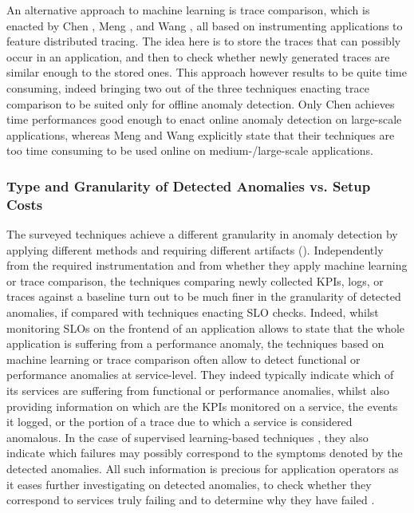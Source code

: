 An alternative approach to machine learning is trace comparison, which is enacted by Chen \etal \cite{39_Chen2020_MatrixSketchBasedAnomalyDetection}, Meng \etal \cite{23_Meng2021_DetectingAnomaliesMicroservices}, and Wang \etal \cite{26_Wang2020_WorkflowAwareFaultDiagnosis}, all based on instrumenting applications to feature distributed tracing.
The idea here is to store the traces that can possibly occur in an application, and then to check whether newly generated traces are similar enough to the stored ones.
This approach however results to be quite time consuming, indeed bringing two out of the three techniques enacting trace comparison to be suited only for offline anomaly detection.
Only Chen \etal \cite{39_Chen2020_MatrixSketchBasedAnomalyDetection} achieves time performances good enough to enact online anomaly detection on large-scale applications, whereas Meng \etal \cite{23_Meng2021_DetectingAnomaliesMicroservices} and Wang \etal \cite{26_Wang2020_WorkflowAwareFaultDiagnosis} explicitly state that their techniques are too time consuming to be used online on medium-/large-scale applications.

\subsubsection{Type and Granularity of Detected Anomalies vs. Setup Costs}
\label{sec:detection:discussion:type-granularity-costs}
The surveyed techniques achieve a different granularity in anomaly detection by applying different methods and requiring different artifacts ().
Independently from the required instrumentation and from whether they apply machine learning or trace comparison, the techniques comparing newly collected KPIs, logs, or traces against a baseline turn out to be much finer in the granularity of detected anomalies, if compared with techniques enacting SLO checks.
Indeed, whilst monitoring SLOs on the frontend of an application allows to state that the whole application is suffering from a performance anomaly, the techniques based on machine learning or trace comparison often allow to detect functional or performance anomalies at service-level.
They indeed typically indicate which of its services are suffering from functional or performance anomalies, whilst also providing information on which are the KPIs monitored on a service, the events it logged, or the portion of a trace due to which a service is considered anomalous.
In the case of supervised learning-based techniques \cite{36_Bogatinovski2020_SelfSupervisedAnomalyDetection,15_Du2018_AnomalyDetectionContainerMicroservices,02_Zhou2019_LatentErrorPrediction,34_Nedelkoski2019_AnomalyDetectionDistributedTracing,33_Mariani2020_PredictingFailures,17_Gan2019_Seer}, they also indicate which failures may possibly correspond to the symptoms denoted by the detected anomalies.
All such information is precious for application operators as it eases further investigating on detected anomalies, \eg to check whether they correspond to services truly failing and to determine why they have failed \cite{Brogi2020_FailureCausalities}.

